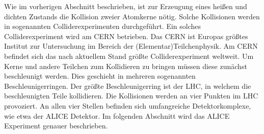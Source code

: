 Wie im vorherigen Abschnitt beschrieben, ist zur Erzeugung eines hei{\ss}en und dichten Zustands die Kollision zweier Atomkerne n\"otig.
Solche Kollisionen werden in sogenannten Colliderexperimenten durchgef\"uhrt.
Ein solches Colliderexperiment wird am CERN betrieben.
Das CERN ist Europas gr\"o{\ss}tes Institut zur Untersuchung im Bereich der (Elementar)Teilchenphysik.
Am CERN befindet sich das nach aktuellem Stand gr\"o{\ss}te Colliderexperiment weltweit.
Um Kerne und andere Teilchen zum Kollidieren zu bringen m\"ussen diese zun\"achst beschleunigt werden.
Dies geschieht in mehreren sogenannten Beschleunigerringen.
Der gr\"o{\ss}te Beschleunigerring ist der LHC, in welchem die beschleunigten Teile kollidieren.
Die Kollisionen werden an vier Punkten im LHC provoziert.
An allen vier Stellen befinden sich umfangreiche Detektorkomplexe, wie etwa der ALICE Detektor.
Im folgenden Abschnitt wird das ALICE Experiment genauer beschrieben.